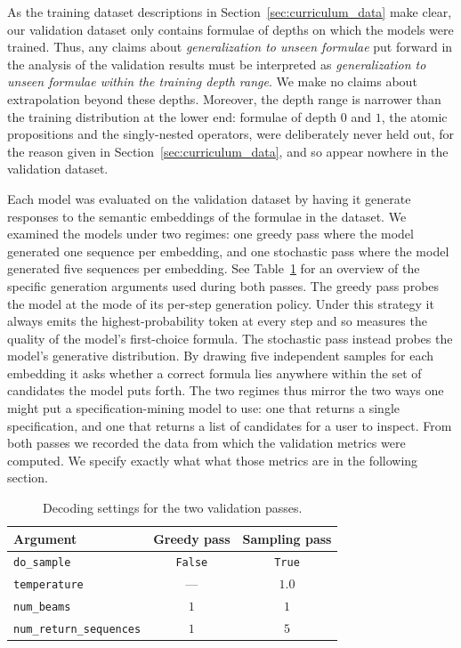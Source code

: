 \documentclass[titlepage,a4paper,11pt]{report}
\DeclareRobustCommand{\RSnew}[1]{{\color{blue!65!black}#1}}
\begin{document}
    As the training dataset descriptions \RSnew{in Section~\ref{sec:curriculum_data} make} clear, our validation dataset only contains formulae of depths on which the models were trained. Thus, any claims about \emph{generalization to unseen formulae} put forward in the analysis of the validation results must be interpreted as \emph{generalization to unseen formulae within the training depth range}. We make no claims about extrapolation beyond these depths. Moreover, the depth range is narrower than the training distribution at the lower end: formulae of depth $0$ and $1$, the atomic propositions and the singly-nested operators, were deliberately never held out, for the reason given in Section~\ref{sec:curriculum_data}, and so appear nowhere in the validation dataset.
    
    Each model was evaluated on the validation dataset by having it generate responses to the semantic embeddings of the formulae in the dataset. We examined the models under two regimes: one greedy pass where the model generated one sequence per embedding, and one stochastic pass where the model generated five sequences per embedding. See Table~\ref{tab:validation_generation_settings} for an overview of the specific generation arguments used during both passes. The greedy pass probes the model at the mode of its per-step generation policy. Under this strategy it always emits the highest-probability token at every step and so measures the quality of the model's first-choice formula. The stochastic pass instead probes the model's generative distribution. By drawing five independent samples for each embedding it asks whether a correct formula lies anywhere within the set of candidates the model puts forth. The two regimes thus mirror the two ways one might put a specification-mining model to use: one that returns a single specification, and one that returns a list of candidates for a user to inspect. From both passes we recorded the data from which the validation metrics were computed. We specify exactly what what those metrics are in the following section. 
    
    \begin{table}[ht]
        \centering
        \caption{Decoding settings for the two validation passes.}
        \label{tab:validation_generation_settings}
        \begin{tabular}{lcc}
            \toprule
            Argument & Greedy pass & Sampling pass \\
            \midrule
            \texttt{do\_sample}             & \texttt{False}    & \texttt{True} \\
            \texttt{temperature}            & ---               & $1.0$ \\
            \texttt{num\_beams}             & $1$               & $1$ \\
            \texttt{num\_return\_sequences} & $1$               & $5$ \\
            \bottomrule
        \end{tabular}
    \end{table}
    
\end{document}
